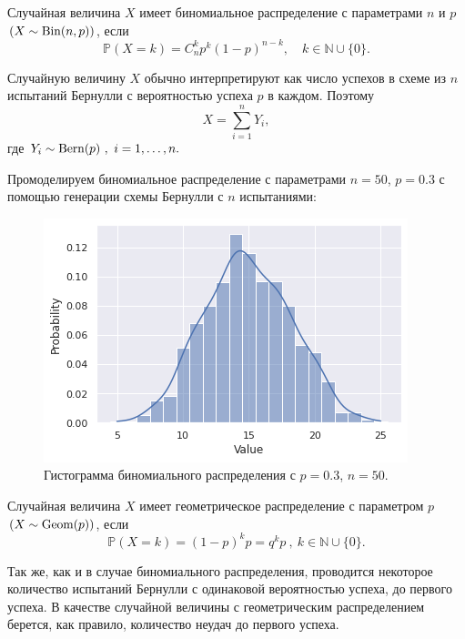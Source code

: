 \begin{definition}
	Случайная величина $X$ имеет биномиальное распределение с параметрами
     $n$ и $p$ $(X \sim \operatorname{Bin}(n,p))$, если
	$$ \mathbb{P}(X = k) = C^k_n p^k (1 - p)^{n - k}, \quad k \in
     \mathbb{N} \cup \{0\}. $$
\end{definition}

Случайную величину $X$ обычно интерпретируют как число успехов в схеме
 из $n$ испытаний Бернулли с вероятностью успеха $p$ в каждом. Поэтому
$$ X = \sum_{i = 1}^n Y_i ,$$
 где $Y_i \sim \operatorname{Bern}(p) \ , \ i = 1,\dots,n.$

 Промоделируем биномиальное распределение с параметрами $n = 50$, $p = 0.3$
 с помощью генерации схемы Бернулли с $n$ испытаниями:
 
 \begin{figure}[h]
	\begin{center}
		\includegraphics[width=0.85\linewidth]{"./resources/binominal.png"}
		\caption{Гистограмма биномиального распределения с $p = 0.3$, $n = 50$.}
	\end{center}
\end{figure}


\begin{definition}
	Случайная величина $X$ имеет геометрическое распределение с
      параметром $p$ $(X\sim \operatorname{Geom}(p))$, если
	$$ \mathbb{P}(X = k) = (1 - p)^kp = q^k p \ , \ k \in \mathbb{N} \cup 
     \{0\}. $$
\end{definition}

Так же, как и в случае биномиального распределения, проводится некоторое
 количество испытаний Бернулли с одинаковой вероятностью успеха, до
 первого успеха. В качестве случайной величины с геометрическим распределением
 берется, как правило, количество неудач до первого успеха.

